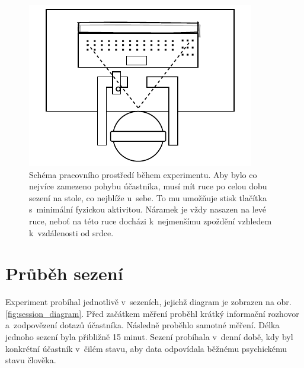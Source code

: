     \begin{figure}[H]
        \centering
        \includegraphics[scale=1.8]{obrazky-figures/pracovni_prostredi.pdf}
        \caption{Schéma pracovního prostředí během experimentu. Aby bylo co nejvíce zamezeno pohybu účastníka, musí mít ruce po celou dobu sezení na stole, co nejblíže u~sebe. To mu umožňuje stisk tlačítka s~minimální fyzickou aktivitou. Náramek je vždy nasazen na levé ruce, neboť na této ruce docházi k~nejmenšímu zpoždění vzhledem k~vzdálenosti od srdce.}
        \label{fig:pracovni_prostredi}
    \end{figure}
    
    \section{Průběh sezení}
    Experiment probíhal jednotlivě v~sezeních, jejichž diagram je zobrazen na obr.\,\ref{fig:session_diagram}. Před začátkem měření proběhl krátký informační rozhovor a~zodpovězení dotazů účastníka. Následně proběhlo samotné měření. Délka jednoho sezení byla přibližně 15 minut. Sezení probíhala v~denní době, kdy byl konkrétní účastník v~čilém stavu, aby data odpovídala běžnému psychickému stavu člověka. 
    
